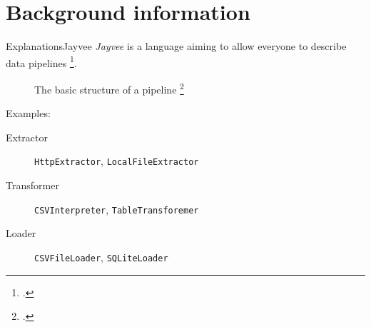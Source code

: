 \section{Background information} %
\begin{frame}[t]{Explanations}{Jayvee}
	\emph{Jayvee} is a language aiming to allow everyone to describe data pipelines \footcite{jvalue:jayvee}.
	\begin{figure}[h]
		\begin{center}
			
		\end{center}
		\caption{The basic structure of a pipeline \footcite{jvalue:jayvee:docs:core_concepts}}
	\end{figure}
	\pause
	Examples:
	\begin{description}
		\item[Extractor] \Verb|HttpExtractor|, \Verb|LocalFileExtractor|
		\item[Transformer] \Verb|CSVInterpreter|, \Verb|TableTransforemer|
		\item[Loader] \Verb|CSVFileLoader|, \Verb|SQLiteLoader|
	\end{description}
\end{frame}


